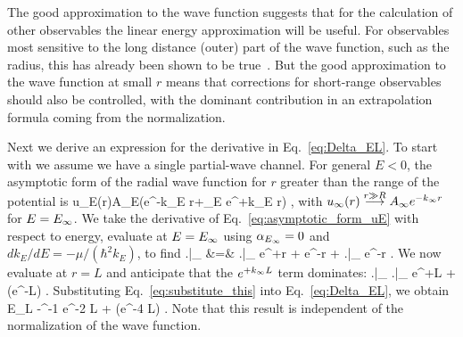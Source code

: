 	The good approximation to the wave function suggests that for the
	calculation of other observables the linear energy approximation will
	be useful.  For observables most sensitive to the long distance
	(outer) part of the wave function, such as the radius, this has
	already been shown to be true~\cite{Furnstahl:2012qg}.  But the good
	approximation to the wave function at small $r$ means that corrections
	for short-range observables should also be controlled, with the
	dominant contribution in an extrapolation formula coming from the
	normalization.

	Next we derive an expression for the derivative in
	Eq.~\eqref{eq:Delta_EL}.  To start with we assume we have a single
	partial-wave channel.  For general $E < 0$, the asymptotic form of the
	radial wave function for $r$ greater than the range of the potential is
	\beq
	  u_E(r)\longrightarrow A_E(e^{-k_E r}+\alpha_E e^{+k_E r})
	  \;,
	  \label{eq:asymptotic_form_uE}
	\eeq
	with $u_\infty(r)\overset{r \gg R}\longrightarrow A_{\infty} e^{-k_{\infty} r}$
	for $E=E_{\infty}$.  We take the derivative of
	Eq.~\eqref{eq:asymptotic_form_uE} with respect to energy, evaluate at
	$E=E_{\infty}$ using $\alpha_{E_{\infty}}=0$ and $dk_E/dE = -\mu/(\hbar^2 k_E)$,
	to find
	\bea
	    \left.\right|_{\Einf} &=&
	    \Ainf \left.\right|_{\Einf} e^{+\kinf r}
	    +
	    \Ainf {} e^{-\kinf r}
	    +
	    \left.\right|_{\Einf} e^{-\kinf r}
	    \;.
	  \label{eq:entire_correction}
	\eea
	We now evaluate at $r=L$ and anticipate that the $e^{+k_{\infty} L}$ term
	dominates:
	\beq
	  \left.\right|_{\Einf}
	  \approx \Ainf \left.\right|_{\Einf} e^{+\kinf L}
	   + (e^{-\kinf L})
	   \;.
	  \label{eq:substitute_this}
	\eeq
	Substituting Eq.~\eqref{eq:substitute_this} into
	Eq.~\eqref{eq:Delta_EL}, we obtain
	\beq \Delta E_L \approx -^{-1} e^{-2 \kinf L} + (e^{-4
	  \kinf L}) \;.
	\eeq
	Note that this result is independent of	the normalization of the
	wave function.

